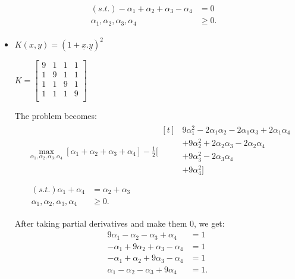 \documentclass[letter, 12pt]{article}
\begin{document}
\begin{enumerate}
\begin{align*}
    	&
    	\begin{aligned}
    	(s.t.) -\alpha_1 + \alpha_2 + \alpha_3 -\alpha_4 &= 0 \\
    	\alpha_1, \alpha_2, \alpha_3, \alpha_4 &\ge 0.
    	\end{aligned}
    	\end{align*}
    	\begin{itemize}
    		\item{$ K(x, y) = (1 + \underline{x}.\underline{y})^ 2 $}
    		\par{}
    		$ K = \begin{bmatrix}
    		9 & 1 & 1 & 1 \\
    		1 & 9 & 1 & 1 \\
    		1 & 1 & 9 & 1 \\
    		1 & 1 & 1 & 9 \\
    		\end{bmatrix} $
    		\par{The problem becomes:}
    		\begin{align*}
    		&\max_{\alpha_1, \alpha_2, \alpha_3, \alpha_4} [\alpha_1 + \alpha_2 + \alpha_3 + \alpha_4] - \frac{1}{2} [
    		\begin{aligned}[t]
    		&9 \alpha_1^2 - 2\alpha_1 \alpha_2 - 2\alpha_1 \alpha_3 + 2\alpha_1 \alpha_4 \\
    		& + 9 \alpha_2^2 + 2\alpha_2 \alpha_3 - 2\alpha_2 \alpha_4 \\
    		& + 9 \alpha_3^2 - 2\alpha_3 \alpha_4 \\
    		& + 9 \alpha_4^2 ] \\
    		\end{aligned} \\
    		&
    		\begin{aligned}
    		(s.t.) \alpha_1 + \alpha_4 &= \alpha_2 + \alpha_3 \\
    		\alpha_1, \alpha_2, \alpha_3, \alpha_4 &\ge 0.
    		\end{aligned}
    		\end{align*}
    		\par{After taking partial derivatives and make them 0, we get:}
    		\begin{align*}
    			9 \alpha_1 - \alpha_2 - \alpha_3 + \alpha_4 &= 1 \\
    			-\alpha_1 + 9 \alpha_2 + \alpha_3 - \alpha_4 &= 1 \\
    			- \alpha_1 + \alpha_2 + 9 \alpha_3 - \alpha_4 &= 1 \\
    			\alpha_1 - \alpha_2 - \alpha_3 + 9 \alpha_4 &= 1 .

\end{align*}
\end{itemize}
\end{enumerate}
\end{document}
